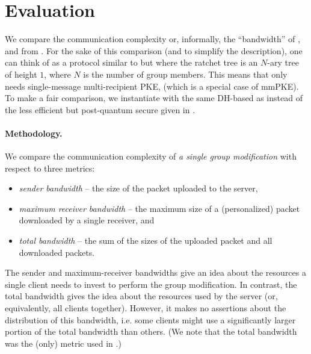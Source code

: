 
\section{Evaluation}\label{sec:eval}
We compare the communication complexity or, informally, the ``bandwidth'' of \saik, \protITK and \protCMPKE from \cite{hashimoto2021cmpke}. For the sake of this comparison (and to simplify the description), one
can think of \protCMPKE as a protocol similar to \saik but where the ratchet tree is an $N$-ary tree of height $1$, where $N$ is the number of group members.
This means that \protCMPKE only needs single-message multi-recipient PKE, \mPKE (which is a special case of mmPKE).
To make a fair comparison, we instantiate \protCMPKE with the same DH-based \mPKE as \saik
instead of the less efficient but post-quantum secure \mPKE
given in \cite{hashimoto2021cmpke}.


\paragraph{Methodology.}
We compare the communication complexity of \emph{a single group modification} with respect to three metrics:
\begin{itemize}
	\item  \emph{sender bandwidth} -- the size of the packet uploaded to the
server,
\item  \emph{maximum receiver bandwidth} -- the maximum size of a (personalized) packet downloaded by a single
receiver, and
\item   \emph{total bandwidth} --  the sum of the sizes of the uploaded packet and all downloaded packets.
\end{itemize}
The sender and maximum-receiver bandwidths give an idea about the resources a single client needs to invest to perform
the group modification. In contrast, the total bandwidth gives the idea about the resources used by the server (or,
equivalently, all clients together). However, it makes no assertions about the distribution of this bandwidth, i.e. some
clients might use a significantly larger portion of the total bandwidth than others. (We note that the total bandwidth was the (only) metric used in \cite{hashimoto2021cmpke}.)

